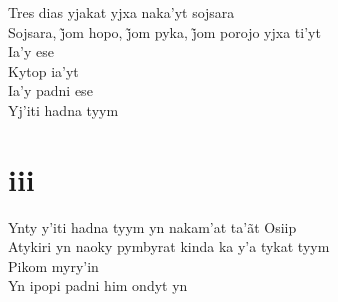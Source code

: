 \bigskip

\begin{linenumbers}\begingroup\raggedright
 
\noindent   Tres dias yjakat yjxa naka'yt sojsara\\
  Sojsara, j̃om hopo, j̃om pyka, j̃om porojo yjxa ti’yt\\
  Ia'y ese\\
  Kytop ia'yt\\
  Ia'y padni ese\\
  Yj'iti hadna tyym
 
 
\medskip
\section{iii}

  \noindent Ynty y'iti hadna tyym yn nakam'at ta'ãt Osiip\\
  Atykiri yn naoky pymbyrat kinda ka y'a tykat tyym\\
  Pikom myry'in\\
  Yn ipopi padni him ondyt yn
 
\end{linenumbers}\endgroup

\bigskip

